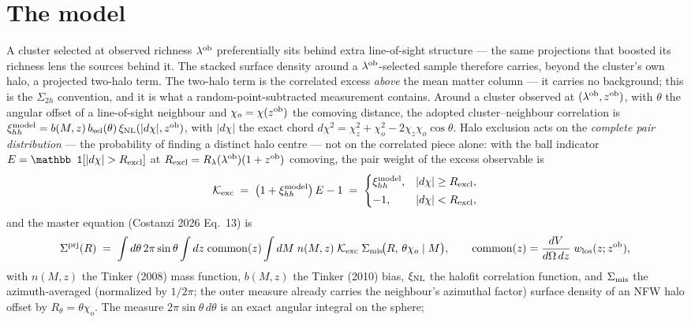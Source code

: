 \section{The model}
\label{sec:model}

A cluster selected at observed richness $\lambda^{\rm ob}$ preferentially sits behind
extra line-of-sight structure --- the same projections that boosted its
richness lens the sources behind it. The stacked surface density around a
$\lambda^{\rm ob}$-selected sample therefore carries, beyond the cluster's own halo, a
projected two-halo term. The two-halo term is the correlated excess
\emph{above} the mean matter column --- it carries no background; this is
the  $\Sigma_{2h}$ convention, and it is what a
random-point-subtracted measurement contains. Around a cluster observed
at $(\lambda^{\rm ob}, z^{\rm ob})$, with $\theta$ the angular offset of a line-of-sight
neighbour and $\chi_o = \chi(z^{\rm ob})$ the comoving distance, the adopted
cluster--neighbour correlation is
$\xi_{hh}^{\rm model} = b(M, z)\,b_{\rm sel}(\theta)\,\xi_{\rm NL}(|d\chi|, z^{\rm ob})$, with $|d\chi|$
the exact chord
$d\chi^2 = \chi_z^2 + \chi_o^2 - 2\chi_z\chi_o\cos\theta$. Halo exclusion
acts on the \emph{complete pair distribution} --- the probability of
finding a distinct halo centre --- not on the correlated piece alone:
with the ball indicator $E = \mathbb 1[|d\chi| > \Rexcl]$ at
$R_{\rm excl} = R_\lambda(\lambda^{\rm ob})(1+z^{\rm ob})$ comoving, the pair weight of the excess
observable is
\begin{equation}
\mathcal{K}_{\rm exc} \;=\; \bigl(1 + \xi_{hh}^{\rm model}\bigr)\,E - 1
\;=\;
\begin{cases}
\xi_{hh}^{\rm model}, & |d\chi| \ge R_{\rm excl},\\[2pt]
-1, & |d\chi| < R_{\rm excl},
\end{cases}
\label{eq:kexc}
\end{equation}
and the master equation (Costanzi 2026 Eq.~13) is
\begin{equation}
\Sigma^{\rm prj}(R) \;=\; \int d\theta\, 2\pi\sin\theta
  \int dz\;{\rm common}(z) \int dM\; n(M, z)\;
  \mathcal{K}_{\rm exc}\;
  \Sigma_{\rm mis}\!\big(R,\, \theta\chi_o \mid M\big),
\qquad
{\rm common}(z) = \frac{dV}{d\Omega\,dz}\; w_{\rm los}(z; z^{\rm ob}),
\label{eq:master}
\end{equation}
with $n(M,z)$ the Tinker (2008) mass function, $b(M,z)$ the Tinker (2010)
bias, $\xi_{\rm NL}$ the halofit correlation function, and $\Sigma_{\rm mis}$ the
azimuth-averaged (normalized by $1/2\pi$; the outer measure already
carries the neighbour's azimuthal factor) surface density of an NFW halo
offset by $R_\theta = \theta\chi_o$. The measure
$2\pi\sin\theta\,d\theta$ is an exact angular integral on the sphere;
